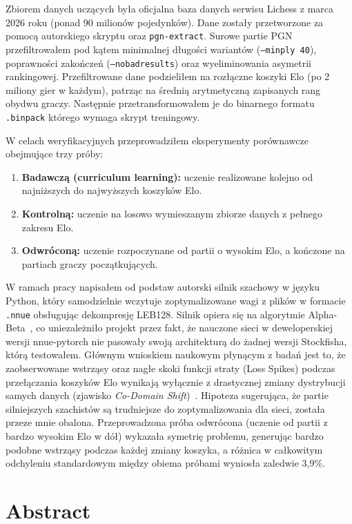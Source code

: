 \documentclass[12pt,a4paper]{report}
\begin{document}
Zbiorem danych uczących była oficjalna baza danych serwisu Lichess z marca 2026 roku (ponad 90 milionów pojedynków). Dane zostały przetworzone za pomocą autorskiego skryptu oraz \texttt{pgn-extract}. Surowe partie PGN przefiltrowałem pod kątem minimalnej długości wariantów (\texttt{--minply 40}), poprawności zakończeń (\texttt{--nobadresults}) oraz wyeliminowania asymetrii rankingowej. Przefiltrowane dane podzieliłem na rozłączne koszyki Elo (po 2 miliony gier w każdym), patrząc na średnią arytmetyczną zapisanych rang obydwu graczy. Następnie przetransformowałem je do binarnego formatu \texttt{.binpack} którego wymaga skrypt treningowy.

W celach weryfikacyjnych przeprowadziłem eksperymenty porównawcze obejmujące trzy próby:
\begin{enumerate}
    \item \textbf{Badawczą (curriculum learning):} uczenie realizowane kolejno od najniższych do najwyższych koszyków Elo.
    \item \textbf{Kontrolną:} uczenie na losowo wymieszanym zbiorze danych z pełnego zakresu Elo.
    \item \textbf{Odwróconą:} uczenie rozpoczynane od partii o wysokim Elo, a kończone na partiach graczy początkujących.
\end{enumerate}

W ramach pracy napisałem od podstaw autorski silnik szachowy w języku Python, który samodzielnie wczytuje zoptymalizowane wagi z plików w formacie \texttt{.nnue} obsługując dekompresję LEB128. Silnik opiera się na algorytmie Alpha-Beta~\cite{knuth1975alphabeta}, co uniezależniło projekt przez fakt, że nauczone sieci w deweloperskiej wersji nnue-pytorch nie pasowały swoją architekturą do żadnej wersji Stockfisha, którą testowałem. Głównym wnioskiem naukowym płynącym z badań jest to, że zaobserwowane wstrząsy oraz nagłe skoki funkcji straty (Loss Spikes) podczas przełączania koszyków Elo wynikają wyłącznie z drastycznej zmiany dystrybucji samych danych (zjawisko \textit{Co-Domain Shift})~\cite{quinonero2009dataset}. Hipoteza sugerująca, że partie silniejszych szachistów są trudniejsze do zoptymalizowania dla sieci, została przeze mnie obalona. Przeprowadzona próba odwrócona (uczenie od partii z bardzo wysokim Elo w dół) wykazała symetrię problemu, generując bardzo podobne wstrząsy podczas każdej zmiany koszyka, a różnica w całkowitym odchyleniu standardowym między obiema próbami wyniosła zaledwie 3,9\%.

\section*{Abstract}
\end{document}
